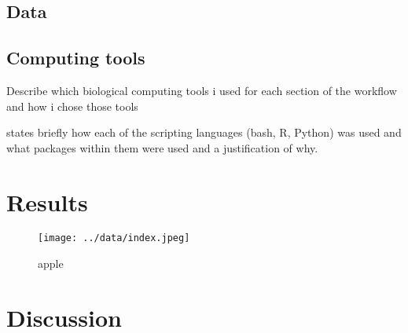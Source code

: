 \documentclass[11pt, titlepage]{article}
\begin{document}
        \subsection*{Data}
        
        \subsection*{Computing tools}

        Describe which biological computing tools i used for each section of the workflow and how i chose those tools
        
        states briefly how each of the scripting languages (bash, R, Python) was used and what packages within them were used and a justification of why.

    \section*{Results}

    \begin{figure}[H]
    \centering
    \texttt{[image: ../data/index.jpeg]}
    \caption{apple}
    \end{figure}

    \section*{Discussion}

    

    
\end{document}
